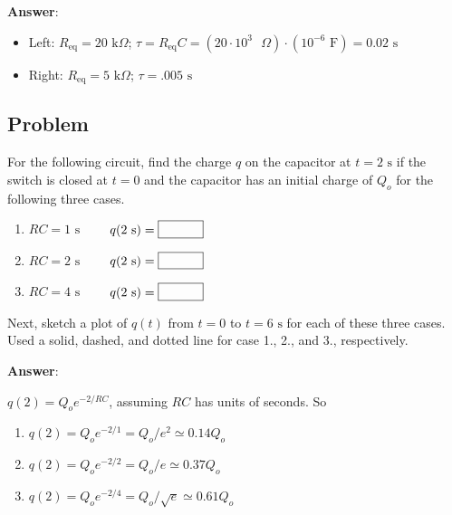 \documentclass{article}
\begin{document}


\ifsolutions
\textbf{Answer}:

    \begin{itemize}

      \item Left: $R_{\text{eq}}=20\text{ k}\Omega$; $\tau = R_{\text{eq}}C = (20\cdot 10^3\text{ }\Omega) \cdot (10^{-6}\text{ F}) = 0.02\text{ s}$

      \item Right: $R_{\text{eq}}=5\text{ k}\Omega$; $\tau=.005\text{ s}$

    \end{itemize}
\else
\vskip 72pt
\fi
\ifsolutions\else
\vskip 72pt
\fi

\newpage

\subsection{Problem}

For the following circuit, find the charge $q$ on the capacitor at $t=2\text{ s}$ if the switch is closed at $t=0$ and the capacitor has an initial charge of $Q_o$ for the following three cases.

\begin{enumerate}

  \item $RC=1\text{ s}\qquad$ $q(2\text{ s})=\fbox{\qquad\phantom M}$

  \item $RC=2\text{ s}\qquad$ $q(2\text{ s})=\fbox{\qquad\phantom M}$

  \item $RC=4\text{ s}\qquad$ $q(2\text{ s})=\fbox{\qquad\phantom M}$

\end{enumerate}

\ifsolutions

\else
\vskip 56.25pt
\fi
\ifsolutions\else
\vskip 56.25pt
\fi

Next, sketch a plot of $q(t)$ from $t=0$ to $t=6\text{ s}$ for each of these three cases. Used a solid, dashed, and dotted line for case 1., 2., and 3., respectively.



\ifsolutions
\textbf{Answer}:

$q(2)=Q_oe^{-2/RC}$, assuming $RC$ has units of seconds. So

    \begin{enumerate}

      \item $q(2)=Q_oe^{-2/1}=Q_o/e^2 \simeq 0.14 Q_o$

      \item $q(2)=Q_oe^{-2/2}=Q_o/e \simeq 0.37 Q_o$

      \item $q(2)=Q_oe^{-2/4}=Q_o/\sqrt{e} \simeq 0.61 Q_o$

    \end{enumerate}
\end{document}
